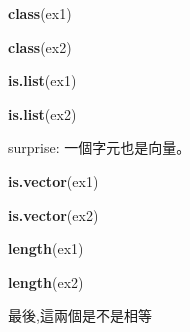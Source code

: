 \documentclass[]{book}
\newenvironment{Shaded}{\begin{snugshade}}{\end{snugshade}}
\newcommand{\KeywordTok}[1]{\textcolor[rgb]{0.13,0.29,0.53}{\textbf{#1}}}
\newcommand{\NormalTok}[1]{#1}
\theoremstyle{definition}
\theoremstyle{definition}
\theoremstyle{definition}
\theoremstyle{remark}
\begin{document}
\begin{Shaded}
\begin{Highlighting}[]
\KeywordTok{class}\NormalTok{(ex1)}
\end{Highlighting}
\end{Shaded}

\begin{Shaded}
\begin{Highlighting}[]
\KeywordTok{class}\NormalTok{(ex2)}
\end{Highlighting}
\end{Shaded}

\begin{Shaded}
\begin{Highlighting}[]
\KeywordTok{is.list}\NormalTok{(ex1)}
\end{Highlighting}
\end{Shaded}

\begin{Shaded}
\begin{Highlighting}[]
\KeywordTok{is.list}\NormalTok{(ex2)}
\end{Highlighting}
\end{Shaded}

surprise: 一個字元也是向量。

\begin{Shaded}
\begin{Highlighting}[]
\KeywordTok{is.vector}\NormalTok{(ex1)}
\end{Highlighting}
\end{Shaded}

\begin{Shaded}
\begin{Highlighting}[]
\KeywordTok{is.vector}\NormalTok{(ex2)}
\end{Highlighting}
\end{Shaded}

\begin{Shaded}
\begin{Highlighting}[]
\KeywordTok{length}\NormalTok{(ex1)}
\end{Highlighting}
\end{Shaded}

\begin{Shaded}
\begin{Highlighting}[]
\KeywordTok{length}\NormalTok{(ex2)}
\end{Highlighting}
\end{Shaded}

最後,這兩個是不是相等
\end{document}
